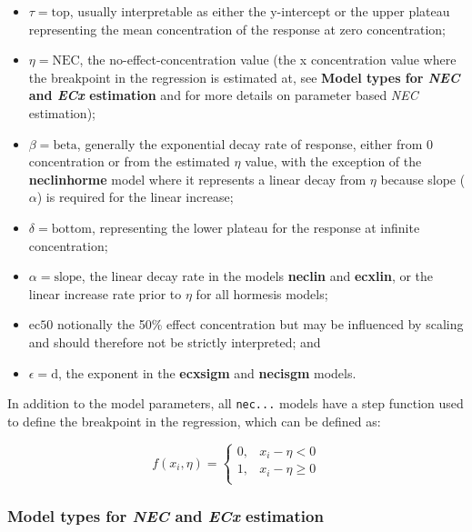 \documentclass[
]{jss}
\begin{document}
\begin{itemize}
\item
  \(\tau = \text{top}\), usually interpretable as either the y-intercept
  or the upper plateau representing the mean concentration of the
  response at zero concentration;
\item
  \(\eta = \text{NEC}\), the no-effect-concentration value (the x
  concentration value where the breakpoint in the regression is
  estimated at, see \textbf{Model types for \emph{NEC} and \emph{ECx}
  estimation} and \citep{Fox2010} for more details on parameter based
  \emph{NEC} estimation);
\item
  \(\beta = \text{beta}\), generally the exponential decay rate of
  response, either from 0 concentration or from the estimated \(\eta\)
  value, with the exception of the \textbf{neclinhorme} model where it
  represents a linear decay from \(\eta\) because slope (\(\alpha\)) is
  required for the linear increase;
\item
  \(\delta = \text{bottom}\), representing the lower plateau for the
  response at infinite concentration;
\item
  \(\alpha = \text{slope}\), the linear decay rate in the models
  \textbf{neclin} and \textbf{ecxlin}, or the linear increase rate prior
  to \(\eta\) for all hormesis models;
\item
  \(\text{ec50}\) notionally the 50\% effect concentration but may be
  influenced by scaling and should therefore not be strictly
  interpreted; and
\item
  \(\epsilon = \text{d}\), the exponent in the \textbf{ecxsigm} and
  \textbf{necisgm} models.
\end{itemize}

In addition to the model parameters, all \texttt{nec...} models have a
step function used to define the breakpoint in the regression, which can
be defined as:

\[
f(x_i, \eta) = \begin{cases} 
      0, & x_i - \eta < 0 \\
      1, & x_i - \eta \geq 0 \\
   \end{cases}
\]

\hypertarget{model-types-for-nec-and-ecx-estimation}{%
\subsubsection{\texorpdfstring{Model types for \emph{NEC} and \emph{ECx}
estimation}{Model types for NEC and ECx estimation}}\label{model-types-for-nec-and-ecx-estimation}}
\end{document}
